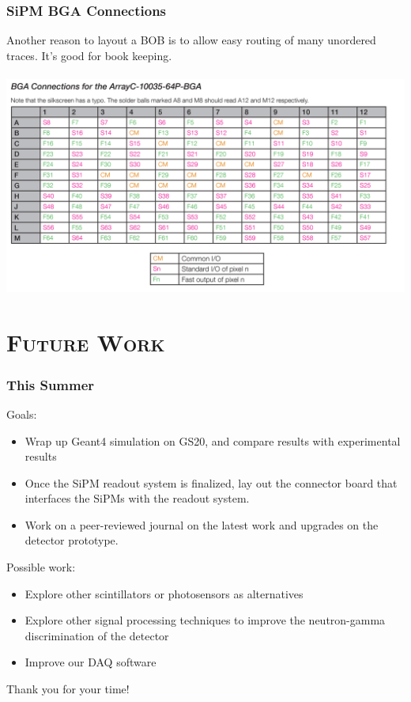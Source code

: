 \documentclass[xcolor=x11names, compress, handout]{beamer}
\renewcommand{\(}{\begin{columns}}
\renewcommand{\)}{\end{columns}}
\newcommand{\<}[1]{\begin{column}{#1}}
\renewcommand{\>}{\end{column}}
\begin{document}
\begin{frame}
  \frametitle{SiPM BGA Connections}
  \scriptsize Another reason to layout a BOB is to allow easy routing of many unordered traces. It's good for book keeping. \\
  \
  \includegraphics[width=\textwidth]{images/SiPM_pinout.png}
\end{frame}

\section{\scshape Future Work}

\begin{frame}[c]
\frametitle{This Summer}
Goals:
  \begin{itemize}
    \item Wrap up Geant4 simulation on GS20, and compare results with experimental results
    \item Once the SiPM readout system is finalized, lay out the connector board that interfaces the SiPMs with the readout system.
    \item Work on a peer-reviewed journal on the latest work and upgrades on the detector prototype.
  \end{itemize}

Possible work:
  \begin{itemize}
    \item Explore other scintillators or photosensors as alternatives
    \item Explore other signal processing techniques to improve the neutron-gamma discrimination of the detector
    \item Improve our DAQ software 
  \end{itemize}
\end{frame}

% 



\begin{frame}
  \vspace{3cm}
  \centering
  Thank you for your time!
  \vspace{3cm}
\end{frame}
\end{document}

